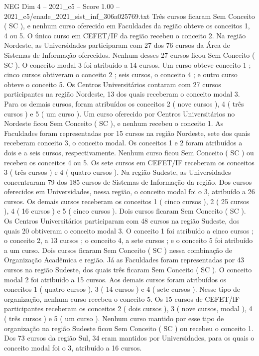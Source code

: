 \begin{textsample}{NEG Dim 4 – 2021\_c5 – Score 1.00 – 2021\_c5/enade\_2021\_sist\_inf\_306a025769.txt}
Três cursos ficaram Sem Conceito ( SC ), e nenhum curso oferecido em Faculdades da região obteve os conceitos 1, 4 ou 5.
O único curso em CEFET/IF da região recebeu o conceito 2.
Na região Nordeste, as Universidades participaram com 27 dos 76 cursos da Área de Sistemas de Informação oferecidos.
Nenhum desses 27 cursos ficou Sem Conceito ( SC ).
O conceito modal 3 foi atribuído a 14 cursos.
Um curso obteve conceito 1 ; cinco cursos obtiveram o conceito 2 ; seis cursos, o conceito 4 ; e outro curso obteve o conceito 5.
Os Centros Universitários contaram com 27 cursos participantes na região Nordeste, 13 dos quais receberam o conceito modal 3.
Para os demais cursos, foram atribuídos os conceitos 2 ( nove cursos ), 4 ( três cursos ) e 5 ( um curso ).
Um curso oferecido por Centros Universitários no Nordeste ficou Sem Conceito ( SC ), e nenhum recebeu o conceito 1.
As Faculdades foram representadas por 15 cursos na região Nordeste, sete dos quais receberam conceito 3, o conceito modal.
Os conceitos 1 e 2 foram atribuídos a dois e a seis cursos, respectivamente.
Nenhum curso ficou Sem Conceito ( SC ) ou recebeu os conceitos 4 ou 5.
Os sete cursos em CEFET/IF receberam os conceitos 3 ( três cursos ) e 4 ( quatro cursos ).
Na região Sudeste, as Universidades concentraram 79 dos 185 cursos de Sistemas de Informação da região.
Dos cursos oferecidos em Universidades, nessa região, o conceito modal foi o 3, atribuído a 26 cursos.
Os demais cursos receberam os conceitos 1 ( cinco cursos ), 2 ( 25 cursos ), 4 ( 16 cursos ) e 5 ( cinco cursos ).
Dois cursos ficaram Sem Conceito ( SC ).
Os Centros Universitários participaram com 48 cursos na região Sudeste, dos quais 20 obtiveram o conceito modal 3.
O conceito 1 foi atribuído a cinco cursos ; o conceito 2, a 13 cursos ; o conceito 4, a sete cursos ; e o conceito 5 foi atribuído a um curso.
Dois cursos ficaram Sem Conceito ( SC ) nessa combinação de Organização Acadêmica e região.
Já as Faculdades foram representadas por 43 cursos na região Sudeste, dos quais três ficaram Sem Conceito ( SC ).
O conceito modal 2 foi atribuído a 15 cursos.
Aos demais cursos foram atribuídos os conceitos 1 ( quatro cursos ), 3 ( 14 cursos ) e 4 ( sete cursos ).
Nesse tipo de organização, nenhum curso recebeu o conceito 5.
Os 15 cursos de CEFET/IF participantes receberam os conceitos 2 ( dois cursos ), 3 ( nove cursos, modal ), 4 ( três cursos ) e 5 ( um curso ).
Nenhum curso mantido por esse tipo de organização na região Sudeste ficou Sem Conceito ( SC ) ou recebeu o conceito 1.
Dos 73 cursos da região Sul, 34 eram mantidos por Universidades, para os quais o conceito modal foi o 3, atribuído a 16 cursos.

\end{textsample}
